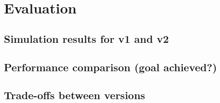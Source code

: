 

\chapter{Evaluation}

\section{Simulation results for v1 and v2}

\section{Performance comparison (goal achieved?)}

\section{Trade-offs between versions}
